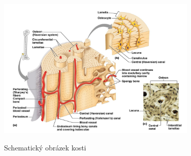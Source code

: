\documentclass[DIV=8]{scrreprt}
\begin{document}
\begin{figure}
    \caption{Schematický obrázek kosti}
    \includegraphics[width=0.85\textwidth]{kost.png}
    \centering
    \label{}
\end{figure}
\end{document}
